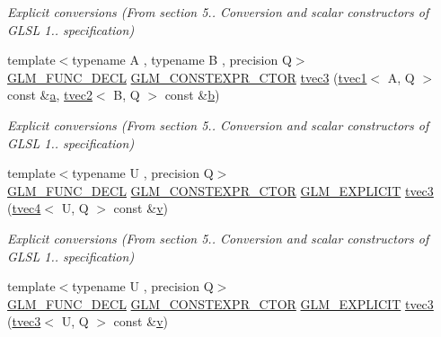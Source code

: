 \begin{DoxyCompactItemize}
\begin{DoxyCompactList}\small\item\em Explicit conversions (From section 5.. Conversion and scalar constructors of G\+L\+SL 1.. specification) \end{DoxyCompactList}\item 
{\footnotesize template$<$typename A , typename B , precision Q$>$ }\\\mbox{\hyperlink{setup_8hpp_ab2d052de21a70539923e9bcbf6e83a51}{G\+L\+M\+\_\+\+F\+U\+N\+C\+\_\+\+D\+E\+CL}} \mbox{\hyperlink{setup_8hpp_ad34178a09666081abdb573c14d1f4a5a}{G\+L\+M\+\_\+\+C\+O\+N\+S\+T\+E\+X\+P\+R\+\_\+\+C\+T\+OR}} \mbox{\hyperlink{structglm_1_1tvec3_a723d47b43e28307cfd4fdb806379fd89}{tvec3}} (\mbox{\hyperlink{structglm_1_1tvec1}{tvec1}}$<$ A, Q $>$ const \&\mbox{\hyperlink{glad_8h_ac8729153468b5dcf13f971b21d84d4e5}{a}}, \mbox{\hyperlink{structglm_1_1tvec2}{tvec2}}$<$ B, Q $>$ const \&\mbox{\hyperlink{glad_8h_a6eba317e3cf44d6d26c04a5a8f197dcb}{b}})
\begin{DoxyCompactList}\small\item\em Explicit conversions (From section 5.. Conversion and scalar constructors of G\+L\+SL 1.. specification) \end{DoxyCompactList}\item 
{\footnotesize template$<$typename U , precision Q$>$ }\\\mbox{\hyperlink{setup_8hpp_ab2d052de21a70539923e9bcbf6e83a51}{G\+L\+M\+\_\+\+F\+U\+N\+C\+\_\+\+D\+E\+CL}} \mbox{\hyperlink{setup_8hpp_ad34178a09666081abdb573c14d1f4a5a}{G\+L\+M\+\_\+\+C\+O\+N\+S\+T\+E\+X\+P\+R\+\_\+\+C\+T\+OR}} \mbox{\hyperlink{setup_8hpp_a6c74f5a5e7b134ab69023ff9a30d4d5d}{G\+L\+M\+\_\+\+E\+X\+P\+L\+I\+C\+IT}} \mbox{\hyperlink{structglm_1_1tvec3_a63301c5a33a1fd31f0046f8c24eb6184}{tvec3}} (\mbox{\hyperlink{structglm_1_1tvec4}{tvec4}}$<$ U, Q $>$ const \&\mbox{\hyperlink{glad_8h_a14cfbe2fc2234f5504618905b69d1e06}{v}})
\begin{DoxyCompactList}\small\item\em Explicit conversions (From section 5.. Conversion and scalar constructors of G\+L\+SL 1.. specification) \end{DoxyCompactList}\item 
{\footnotesize template$<$typename U , precision Q$>$ }\\\mbox{\hyperlink{setup_8hpp_ab2d052de21a70539923e9bcbf6e83a51}{G\+L\+M\+\_\+\+F\+U\+N\+C\+\_\+\+D\+E\+CL}} \mbox{\hyperlink{setup_8hpp_ad34178a09666081abdb573c14d1f4a5a}{G\+L\+M\+\_\+\+C\+O\+N\+S\+T\+E\+X\+P\+R\+\_\+\+C\+T\+OR}} \mbox{\hyperlink{setup_8hpp_a6c74f5a5e7b134ab69023ff9a30d4d5d}{G\+L\+M\+\_\+\+E\+X\+P\+L\+I\+C\+IT}} \mbox{\hyperlink{structglm_1_1tvec3_a8e402385548b575f903d25fbefede459}{tvec3}} (\mbox{\hyperlink{structglm_1_1tvec3}{tvec3}}$<$ U, Q $>$ const \&\mbox{\hyperlink{glad_8h_a14cfbe2fc2234f5504618905b69d1e06}{v}})

\end{DoxyCompactItemize}
